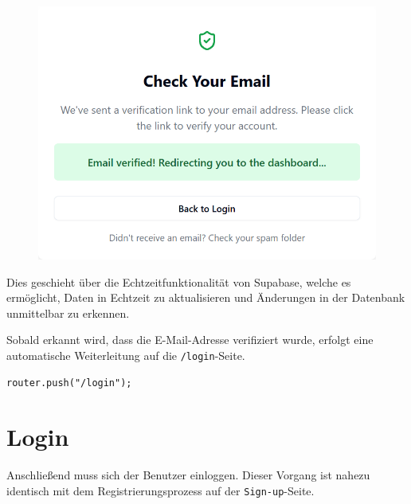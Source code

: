 \begin{inhalt}
\begin{figure}[!htb]
\centering
\includegraphics[width=1\textwidth]{files/Thomas/pics/Website/emailconfirmed/checkyouremails_verified.png}
\caption[Bildbezeichnung für Abbildungsverzeichnis]{}
\label{fig:gehaeuse_internet_bild}
\end{figure}

\clearpage

Dies geschieht über die Echtzeitfunktionalität von Supabase, welche es ermöglicht, Daten in Echtzeit zu aktualisieren und Änderungen in der Datenbank unmittelbar zu erkennen.

Sobald erkannt wird, dass die E-Mail-Adresse verifiziert wurde, erfolgt eine automatische Weiterleitung auf die \texttt{/login}-Seite.

\begin{lstlisting}[style=mytsx]
      router.push("/login");
\end{lstlisting}    

\newpage

\section{Login}
\label{ref:Login}
Anschließend muss sich der Benutzer einloggen. Dieser Vorgang ist nahezu identisch mit dem Registrierungsprozess auf der \texttt{Sign-up}-Seite. 


\end{inhalt}
